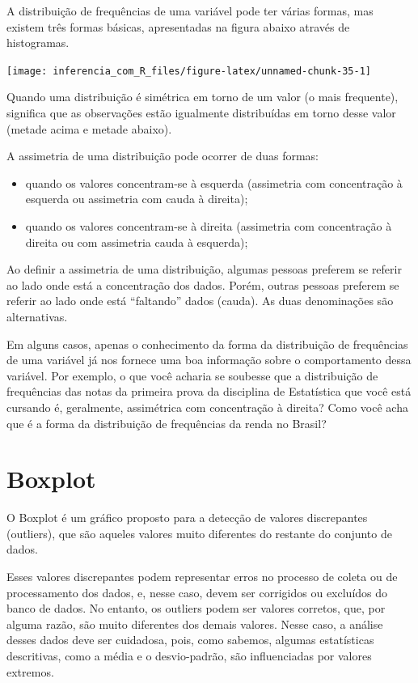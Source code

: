 \documentclass[
]{book}
\providecommand{\tightlist}{%
  \setlength{\itemsep}{0pt}\setlength{\parskip}{0pt}}
\begin{document}
A distribuição de frequências de uma variável pode ter várias formas, mas existem três formas básicas, apresentadas na figura abaixo através de histogramas.

\begin{center}\texttt{[image: inferencia\_com\_R\_files/figure-latex/unnamed-chunk-35-1]} \end{center}

Quando uma distribuição é simétrica em torno de um valor (o mais frequente), significa que as observações estão igualmente distribuídas em torno desse valor (metade acima e metade abaixo).

A assimetria de uma distribuição pode ocorrer de duas formas:

\begin{itemize}
\tightlist
\item
  quando os valores concentram-se à esquerda (assimetria com concentração à esquerda ou assimetria com cauda à direita);
\item
  quando os valores concentram-se à direita (assimetria com concentração à direita ou com assimetria cauda à esquerda);
\end{itemize}

Ao definir a assimetria de uma distribuição, algumas pessoas preferem se referir ao lado onde está a concentração dos dados. Porém, outras pessoas preferem se referir ao lado onde está ``faltando'' dados (cauda). As duas denominações são alternativas.

Em alguns casos, apenas o conhecimento da forma da distribuição de frequências de uma variável já nos fornece uma boa informação sobre o comportamento dessa variável. Por exemplo, o que você acharia se soubesse que a distribuição de frequências das notas da primeira prova da disciplina de Estatística que você está cursando é, geralmente, assimétrica com concentração à direita? Como você acha que é a forma da distribuição de frequências da renda no Brasil?

\hypertarget{boxplot}{%
\section{Boxplot}\label{boxplot}}

O Boxplot é um gráfico proposto para a detecção de valores discrepantes (outliers), que são aqueles valores muito diferentes do restante do conjunto de dados.

Esses valores discrepantes podem representar erros no processo de coleta ou de processamento dos dados, e, nesse caso, devem ser corrigidos ou excluídos do banco de dados. No entanto, os outliers podem ser valores corretos, que, por alguma razão, são muito diferentes dos demais valores. Nesse caso, a análise desses dados deve ser cuidadosa, pois, como sabemos, algumas estatísticas descritivas, como a média e o desvio-padrão, são influenciadas por valores extremos.
\end{document}
